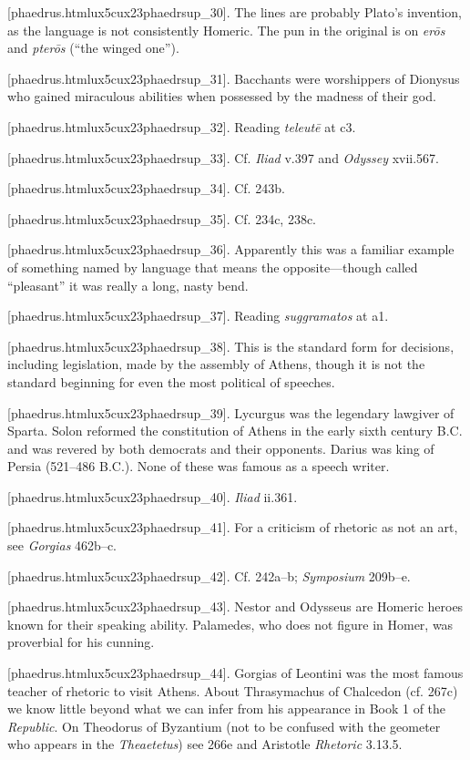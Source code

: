 [phaedrus.htmlux5cux23phaedrsup_30]. The lines are probably
Plato's invention, as the language is not consistently Homeric. The pun
in the original is on {\em erōs} and {\em pterōs} (“the winged one”).

[phaedrus.htmlux5cux23phaedrsup_31]. Bacchants were worshippers
of Dionysus who gained miraculous abilities when possessed by the
madness of their god.

[phaedrus.htmlux5cux23phaedrsup_32]. Reading {\em teleutē} at
c3.

[phaedrus.htmlux5cux23phaedrsup_33]. Cf. {\em Iliad} v.397 and
{\em Odyssey} xvii.567.

[phaedrus.htmlux5cux23phaedrsup_34]. Cf. 243b.

[phaedrus.htmlux5cux23phaedrsup_35]. Cf. 234c, 238c.

[phaedrus.htmlux5cux23phaedrsup_36]. Apparently this was a
familiar example of something named by language that means the
opposite---though called “pleasant” it was really a long, nasty bend.

[phaedrus.htmlux5cux23phaedrsup_37]. Reading {\em suggramatos}
at a1.

[phaedrus.htmlux5cux23phaedrsup_38]. This is the standard form
for decisions, including legislation, made by the assembly of Athens,
though it is not the standard beginning for even the most political of
speeches.

[phaedrus.htmlux5cux23phaedrsup_39]. Lycurgus was the legendary
lawgiver of Sparta. Solon reformed the constitution of Athens in the
early sixth century B.C. and was revered by both democrats and their
opponents. Darius was king of Persia (521--486 B.C.). None of these was
famous as a speech writer.

[phaedrus.htmlux5cux23phaedrsup_40]. {\em Iliad} ii.361.

[phaedrus.htmlux5cux23phaedrsup_41]. For a criticism of
rhetoric as not an art, see {\em Gorgias} 462b--c.

[phaedrus.htmlux5cux23phaedrsup_42]. Cf. 242a--b;
{\em Symposium} 209b--e.

[phaedrus.htmlux5cux23phaedrsup_43]. Nestor and Odysseus are
Homeric heroes known for their speaking ability. Palamedes, who does not
figure in Homer, was proverbial for his cunning.

[phaedrus.htmlux5cux23phaedrsup_44]. Gorgias of Leontini was
the most famous teacher of rhetoric to visit Athens. About Thrasymachus
of Chalcedon (cf. 267c) we know little beyond what we can infer from his
appearance in Book 1 of the {\em Republic}. On Theodorus of Byzantium
(not to be confused with the geometer who appears in the
{\em Theaetetus}) see 266e and Aristotle {\em Rhetoric} 3.13.5.

